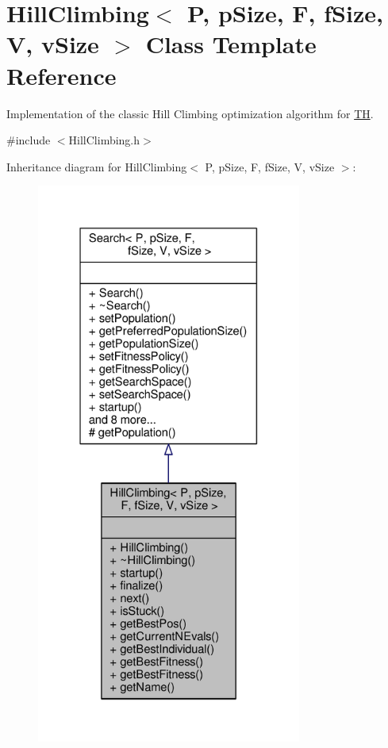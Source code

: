 \hypertarget{classHillClimbing}{}\section{Hill\+Climbing$<$ P, p\+Size, F, f\+Size, V, v\+Size $>$ Class Template Reference}
\label{classHillClimbing}


Implementation of the classic Hill Climbing optimization algorithm for \hyperlink{classTH}{TH}.  




{\ttfamily \#include $<$Hill\+Climbing.\+h$>$}



Inheritance diagram for Hill\+Climbing$<$ P, p\+Size, F, f\+Size, V, v\+Size $>$\+:\nopagebreak
\begin{figure}[H]
\begin{center}
\leavevmode
\includegraphics[width=247pt]{classHillClimbing__inherit__graph}
\end{center}
\end{figure}



